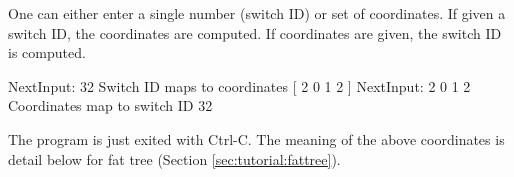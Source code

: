 One can either enter a single number (switch ID) or set of coordinates.
If given a switch ID, the coordinates are computed.
If coordinates are given, the switch ID is computed.

\begin{ShellCmd}
NextInput: 32
Switch ID maps to coordinates [ 2 0 1 2 ]
NextInput: 2 0 1 2
Coordinates map to switch ID 32
\end{ShellCmd}

The program is just exited with Ctrl-C.
The meaning of the above coordinates is detail below for fat tree (Section \ref{sec:tutorial:fattree}).




%




